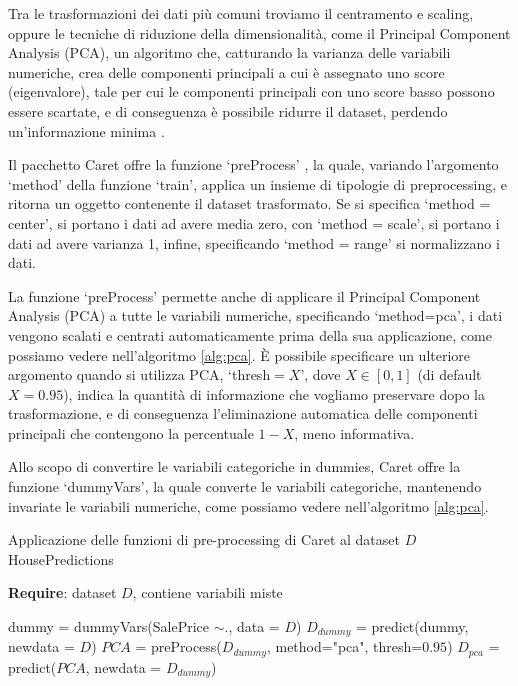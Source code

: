 \documentclass[12pt]{article}
\begin{document}
Tra le trasformazioni dei dati più comuni troviamo il centramento e scaling, oppure le tecniche di riduzione della dimensionalità, 
come il Principal Component Analysis (PCA), un algoritmo che, catturando la varianza delle variabili numeriche, crea delle componenti principali a cui è assegnato uno score (eigenvalore), tale 
per cui le componenti principali con uno score basso possono essere scartate, e di conseguenza è possibile ridurre il dataset, perdendo un'informazione minima \cite{cit:wikipca}.

\bigskip
Il pacchetto Caret offre la funzione ‘preProcess’ \cite{caret:repo}, la quale, variando l'argomento ‘method’ della funzione ‘train’, applica un insieme di tipologie di preprocessing, e ritorna un oggetto contenente il dataset trasformato. 
Se si specifica ‘method = center’, si portano i dati ad avere media zero, con ‘method = scale’, si portano i dati ad avere varianza 1, infine, specificando ‘method = range’ si normalizzano i dati.

La funzione ‘preProcess’ permette anche di applicare il Principal Component Analysis (PCA) a tutte le variabili numeriche, specificando ‘method=pca’, i dati vengono scalati e centrati automaticamente prima della sua applicazione, come possiamo vedere nell'algoritmo \ref{alg:pca}.
È possibile specificare un ulteriore argomento quando si utilizza PCA, ‘thresh$=X$’, dove $X \in [0,1]$ (di default $X=0.95$), indica la quantità di informazione che vogliamo preservare dopo la trasformazione, e di conseguenza 
l'eliminazione automatica delle componenti principali che contengono la percentuale $1-X$, meno informativa.

\bigskip
Allo scopo di convertire le variabili categoriche in dummies, Caret offre la funzione ‘dummyVars’, la quale converte le variabili categoriche, mantenendo invariate le variabili numeriche, come possiamo vedere nell'algoritmo \ref{alg:pca}.

\begin{algorithm}[H]
    \caption{Applicazione delle funzioni di pre-processing di Caret al dataset $D$ HousePredictions}\label{alg:pca}
    \textbf{Require}: dataset $D$, contiene variabili miste
    \begin{algorithmic}[1]
    \State dummy = dummyVars(SalePrice $\sim .$, data = $D$)
    \State $D_{dummy}$ = predict(dummy, newdata = $D$)
    \State $PCA$ = preProcess($D_{dummy}$, method="pca", thresh=$0.95$)
    \State $D_{pca}$ = predict($PCA$, newdata = $D_{dummy}$)
    \end{algorithmic}
\end{algorithm}
\end{document}
